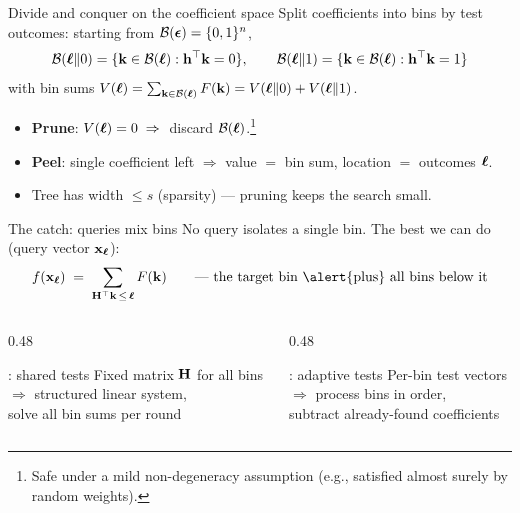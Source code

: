 \documentclass[aspectratio=169,11pt]{beamer}
\begin{document}
\begin{frame}{Divide and conquer on the coefficient space}
  Split coefficients into \alert{bins} by test outcomes: starting from $\mathcal B(\boldsymbol{\epsilon}) = \{0,1\}^n$,
  \begin{equation*}
    \mathcal B(\boldsymbol{\ell} \| 0) = \{\mathbf k \in \mathcal B(\boldsymbol{\ell}) : \mathbf h^\top \mathbf k = 0\}, \qquad
    \mathcal B(\boldsymbol{\ell} \| 1) = \{\mathbf k \in \mathcal B(\boldsymbol{\ell}) : \mathbf h^\top \mathbf k = 1\}
  \end{equation*}
  with \alert{bin sums} $V(\boldsymbol{\ell}) = \sum_{\mathbf k \in \mathcal B(\boldsymbol{\ell})} F(\mathbf k) = V(\boldsymbol{\ell}\|0) + V(\boldsymbol{\ell}\|1)$.
  \vspace{1ex}
  \begin{itemize}
    \item \textbf{Prune}: $V(\boldsymbol{\ell}) = 0 \;\Rightarrow\;$ discard $\mathcal B(\boldsymbol{\ell})$.\footnote{Safe under a
      mild non-degeneracy assumption (e.g., satisfied almost surely by random weights).}
    \item \textbf{Peel}: single coefficient left $\Rightarrow$ value $=$ bin sum, location $=$ outcomes $\boldsymbol{\ell}$.
    \item Tree has width $\le s$ (sparsity) --- pruning keeps the search small.
  \end{itemize}
\end{frame}

\begin{frame}{The catch: queries mix bins}
  No query isolates a single bin. The best we can do (query vector $\mathbf x_{\boldsymbol{\ell}}$):
  \begin{equation*}
    f(\bx_{\bell}) \;=\; \sum_{\bH^\top \bk \,\leq\, \bell} F(\bk)
    \qquad \text{--- the target bin \alert{plus} all bins below it}
  \end{equation*}
  \vspace{1ex}
  \begin{columns}[T]
    \begin{column}{0.48\textwidth}
      \begin{block}{\PASMT: shared tests}
        Fixed matrix $\mathbf H$ for all bins\\
        $\Rightarrow$ structured linear system,\\
        solve all bin sums per round
      \end{block}
    \end{column}
    \begin{column}{0.48\textwidth}
      \begin{block}{\FASMT: adaptive tests}
        Per-bin test vectors\\
        $\Rightarrow$ process bins in order,\\
        subtract already-found coefficients
      \end{block}
    \end{column}
  \end{columns}
\end{frame}
\end{document}
